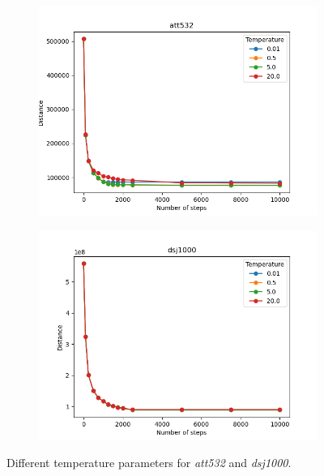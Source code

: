 \begin{figure}[!htb]
	\centering
	\begin{subfigure}{0.45\textwidth}
		\includegraphics[width=\textwidth]{img/att532_temperature}
	\end{subfigure}
	\begin{subfigure}{0.45\textwidth}
		\includegraphics[width=\textwidth]{img/dsj1000_temperature}
	\end{subfigure}
	\caption{Different temperature parameters for \textit{att532} and \textit{dsj1000}.}
	\label{fig:temperature_2}
\end{figure}